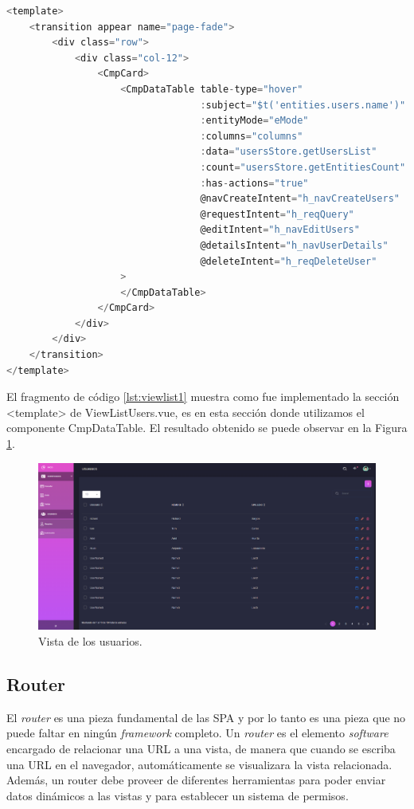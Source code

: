 \begin{lstlisting}[language=C,caption={Sección <template> de ViewListUsers.vue}, label={lst:viewlist1}]
<template>
    <transition appear name="page-fade">
        <div class="row">
            <div class="col-12">
                <CmpCard>
                    <CmpDataTable table-type="hover"
                                  :subject="$t('entities.users.name')"
                                  :entityMode="eMode"
                                  :columns="columns"
                                  :data="usersStore.getUsersList"
                                  :count="usersStore.getEntitiesCount"
                                  :has-actions="true"
                                  @navCreateIntent="h_navCreateUsers"
                                  @requestIntent="h_reqQuery"
                                  @editIntent="h_navEditUsers"
                                  @detailsIntent="h_navUserDetails"
                                  @deleteIntent="h_reqDeleteUser"
                    >
                    </CmpDataTable>
                </CmpCard>
            </div>
        </div>
    </transition>
</template>
\end{lstlisting}

El fragmento de código \ref{lst:viewlist1} muestra como fue implementado la sección <template> de ViewListUsers.vue, es en esta sección donde utilizamos el componente CmpDataTable. El resultado obtenido se puede observar en la Figura \ref{fig:usersList}.

\begin{figure}[htbp]
\centering
\includegraphics[width=\textwidth]{Graphics/usersList}
\caption{Vista de los usuarios.}
\label{fig:usersList}
\end{figure}

\subsection{Router}
El \textit{router} es una pieza fundamental de las SPA y por lo tanto es una pieza que no puede faltar en ningún \textit{framework} completo. Un \textit{router} es el elemento \textit{software} encargado de relacionar una URL a una vista, de manera que cuando se escriba una URL en el navegador, automáticamente se visualizara la vista relacionada. Además, un router debe proveer de diferentes herramientas para poder enviar datos dinámicos a las vistas y para establecer un sistema de permisos.

